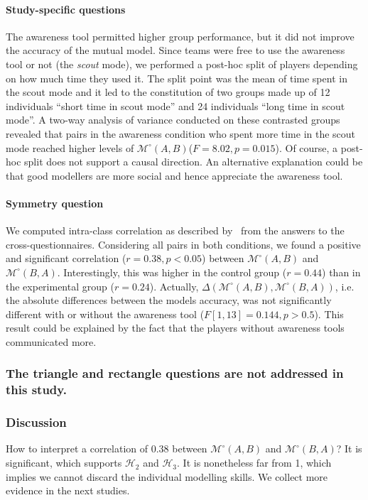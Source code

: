 \documentclass[natbib]{svjour3}
\newcommand{\ie}{i.e.\xspace}
\newcommand{\gModel}[2]{{$\mathcal{M}^{\circ}(#1, #2)$}}
\newcommand{\gMdeg}[2]{{\mathcal{M}^{\circ}(#1, #2)}}
\begin{document}
\paragraph{Study-specific questions} The awareness tool permitted higher group
performance, but it did not improve the accuracy of the mutual model. Since
teams were free to use the awareness tool or not (the \emph{scout} mode), we
performed a post-hoc split of players depending on how much time they used it.
The split point was the mean of time spent in the scout mode and it led to the
constitution of two groups made up of 12 individuals ``short time in scout
mode'' and 24 individuals ``long time in scout mode''. A two-way analysis of
variance conducted on these contrasted groups revealed that pairs in the
awareness condition who spent more time in the scout mode reached higher levels
of \gModel{A}{B}($F = 8.02, p = 0.015$). Of course, a post-hoc split
does not support a causal direction. An alternative explanation could be that
good modellers are more social and hence appreciate the awareness tool.

\paragraph{Symmetry question} We computed intra-class correlation as described
by~\citet{kenny1998data} from the answers to the cross-questionnaires.
Considering all pairs in both conditions, we found a positive and significant
correlation ($r = 0.38, p < 0.05$) between \gModel{A}{B} and \gModel{B}{A}.
Interestingly, this was higher in the control group ($r = 0.44$) than in the
experimental group ($r = 0.24$). Actually, $\Delta(\gMdeg{A}{B},\gMdeg{B}{A})$,
\ie the absolute differences between the models accuracy, was not significantly
different with or without the awareness tool ($F [1,13]= 0.144, p > 0.5$). This
result could be explained by the fact that the players without awareness tools
communicated more.

\subsubsection*{The triangle and rectangle questions are not addressed in this study.}

\subsubsection*{Discussion}

How to interpret a correlation of 0.38 between \gModel{A}{B} and \gModel{B}{A}?
It is significant, which supports $\mathcal{H}_{2}$ and $\mathcal{H}_{3}$. It is
nonetheless far from 1, which implies we cannot discard the individual modelling
skills. We collect more evidence in the next studies.
\end{document}
